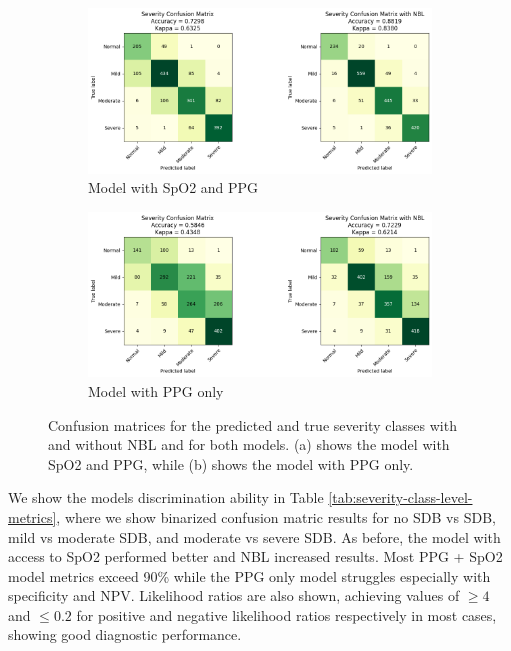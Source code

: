 \begin{figure}
      \begin{subfigure}{\textwidth}
          \includegraphics[width=\textwidth]{images/SevClassConfMatrix}
          \caption{Model with SpO2 and PPG}
      \end{subfigure}
      \begin{subfigure}{\textwidth}
          \includegraphics[width=\textwidth]{images/SevClassConfMatrixNoSpO2}
          \caption{Model with PPG only}
      \end{subfigure}
    \caption{Confusion matrices for the predicted and true severity classes with and without NBL and for both models. (a) shows the model with SpO2 and PPG, while (b) shows the model with PPG only.}
    \label{fig:severity-class-level-confusion-matrices}
\end{figure}

We show the models discrimination ability in Table \ref{tab:severity-class-level-metrics}, where we show binarized confusion matric results for no SDB vs SDB, mild vs moderate SDB, and moderate vs severe SDB. As before, the model with access to SpO2 performed better and NBL increased results. Most PPG + SpO2 model metrics exceed 90\% while the PPG only model struggles especially with specificity and NPV. Likelihood ratios are also shown, achieving values of $\geq 4$ and $\leq 0.2$ for positive and negative likelihood ratios respectively in most cases, showing good diagnostic performance.

